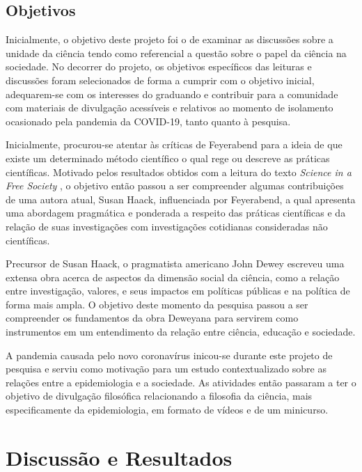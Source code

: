 \documentclass[12pt]{report}
\begin{document}
		\section*{Objetivos}
			Inicialmente, o objetivo deste projeto foi o de examinar as discussões sobre a unidade da ciência tendo como referencial a questão sobre o papel da ciência na sociedade. No decorrer do projeto, os objetivos específicos das leituras e discussões foram selecionados de forma a cumprir com o objetivo inicial, adequarem-se com os interesses do graduando e contribuir para a comunidade com materiais de divulgação acessíveis e relativos ao momento de isolamento ocasionado pela pandemia da COVID-19, tanto quanto à pesquisa.
			
			Inicialmente, procurou-se atentar às críticas de Feyerabend para a ideia de que existe um determinado método científico o qual rege ou descreve as práticas científicas.
			Motivado pelos resultados obtidos com a leitura do texto \textit{Science in a Free Society} \cite{feyerabend-science-free-society}, o objetivo então passou a ser compreender algumas contribuições de uma autora atual, Susan Haack, influenciada por Feyerabend, a qual apresenta uma abordagem pragmática e ponderada a respeito das práticas científicas e da relação de suas investigações com investigações cotidianas consideradas não científicas.
			
			Precursor de Susan Haack, o pragmatista americano John Dewey escreveu uma extensa obra acerca de aspectos da dimensão social da ciência, como a relação entre investigação, valores, e seus impactos em políticas públicas e na política de forma mais ampla. O objetivo deste momento da pesquisa passou a ser compreender os fundamentos da obra Deweyana para servirem como instrumentos em um entendimento da relação entre ciência, educação e sociedade.
			
			A pandemia causada pelo novo coronavírus inicou-se durante este projeto de pesquisa e serviu como motivação para um estudo contextualizado sobre as relações entre a epidemiologia e a sociedade. As atividades então passaram a ter o objetivo de divulgação filosófica relacionando a filosofia da ciência, mais especificamente da epidemiologia, em formato de vídeos e de um minicurso.
	
	
	\vspace*{-0.6cm}
	\chapter*{Discussão e Resultados}
	\vspace*{-0.75cm}
	
\end{document}
